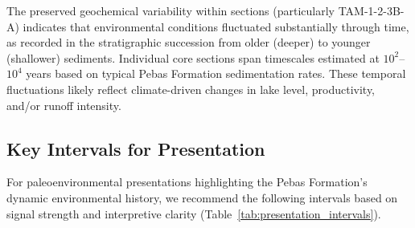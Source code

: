 The preserved geochemical variability within sections (particularly TAM-1-2-3B-A) indicates that environmental conditions fluctuated substantially through time, as recorded in the stratigraphic succession from older (deeper) to younger (shallower) sediments. Individual core sections span timescales estimated at $10^2$--$10^4$ years based on typical Pebas Formation sedimentation rates. These temporal fluctuations likely reflect climate-driven changes in lake level, productivity, and/or runoff intensity.

\subsection{Key Intervals for Presentation}

For paleoenvironmental presentations highlighting the Pebas Formation's dynamic environmental history, we recommend the following intervals based on signal strength and interpretive clarity (Table~\ref{tab:presentation_intervals}).

